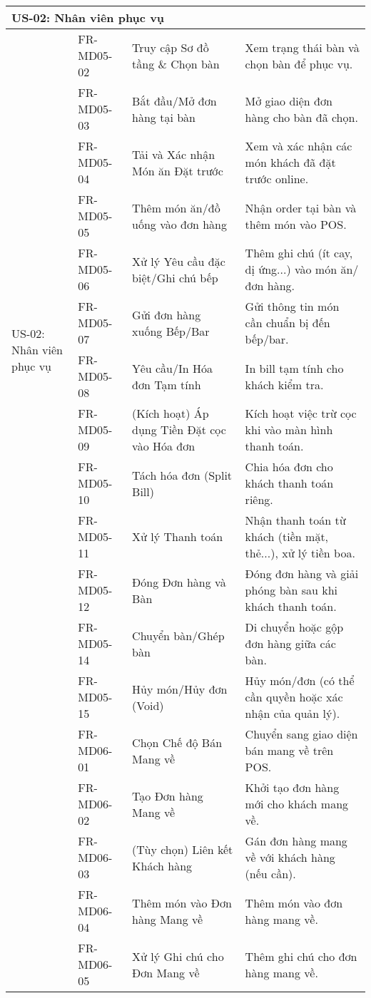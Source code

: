 \begin{longtable}{|m{2.5cm}|m{2.5cm}|m{5cm}|m{5cm}|}
\multicolumn{4}{|l|}{\textbf{US-02: Nhân viên phục vụ}} \\ \hline
\multirow{12}{=}[2pt]{US-02: Nhân viên phục vụ} & FR-MD05-02 & Truy cập Sơ đồ tầng \& Chọn bàn & Xem trạng thái bàn và chọn bàn để phục vụ. \\
& FR-MD05-03 & Bắt đầu/Mở đơn hàng tại bàn & Mở giao diện đơn hàng cho bàn đã chọn. \\
& FR-MD05-04 & Tải và Xác nhận Món ăn Đặt trước & Xem và xác nhận các món khách đã đặt trước online. \\
& FR-MD05-05 & Thêm món ăn/đồ uống vào đơn hàng & Nhận order tại bàn và thêm món vào POS. \\
& FR-MD05-06 & Xử lý Yêu cầu đặc biệt/Ghi chú bếp & Thêm ghi chú (ít cay, dị ứng...) vào món ăn/đơn hàng. \\
& FR-MD05-07 & Gửi đơn hàng xuống Bếp/Bar & Gửi thông tin món cần chuẩn bị đến bếp/bar. \\
& FR-MD05-08 & Yêu cầu/In Hóa đơn Tạm tính & In bill tạm tính cho khách kiểm tra. \\
& FR-MD05-09 & (Kích hoạt) Áp dụng Tiền Đặt cọc vào Hóa đơn & Kích hoạt việc trừ cọc khi vào màn hình thanh toán. \\
& FR-MD05-10 & Tách hóa đơn (Split Bill) & Chia hóa đơn cho khách thanh toán riêng. \\
& FR-MD05-11 & Xử lý Thanh toán & Nhận thanh toán từ khách (tiền mặt, thẻ...), xử lý tiền boa. \\
& FR-MD05-12 & Đóng Đơn hàng và Bàn & Đóng đơn hàng và giải phóng bàn sau khi khách thanh toán. \\
& FR-MD05-14 & Chuyển bàn/Ghép bàn & Di chuyển hoặc gộp đơn hàng giữa các bàn. \\
& FR-MD05-15 & Hủy món/Hủy đơn (Void) & Hủy món/đơn (có thể cần quyền hoặc xác nhận của quản lý). \\ \cline{2-4}
& FR-MD06-01 & Chọn Chế độ Bán Mang về & Chuyển sang giao diện bán mang về trên POS. \\
& FR-MD06-02 & Tạo Đơn hàng Mang về & Khởi tạo đơn hàng mới cho khách mang về. \\
& FR-MD06-03 & (Tùy chọn) Liên kết Khách hàng & Gán đơn hàng mang về với khách hàng (nếu cần). \\
& FR-MD06-04 & Thêm món vào Đơn hàng Mang về & Thêm món vào đơn hàng mang về. \\
& FR-MD06-05 & Xử lý Ghi chú cho Đơn Mang về & Thêm ghi chú cho đơn hàng mang về. \\

\end{longtable}

